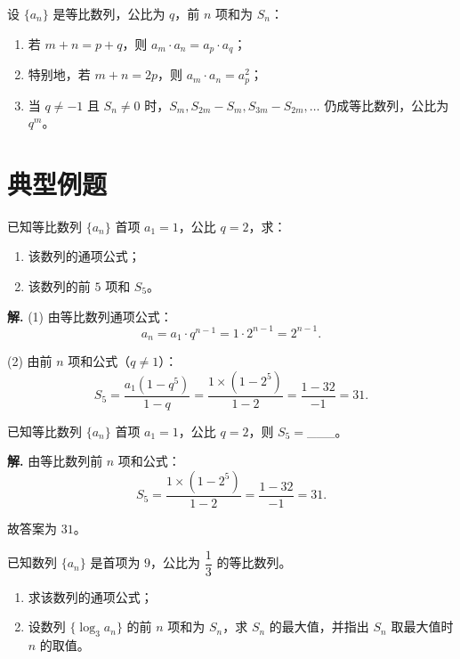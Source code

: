 \documentclass[11pt]{ctexrep}
\begin{document}
\begin{property}[重要性质]
    设 $\{a_n\}$ 是等比数列，公比为 $q$，前 $n$ 项和为 $S_n$：
    \begin{enumerate}
        \item 若 $m + n = p + q$，则 $a_m \cdot a_n = a_p \cdot a_q$；
        \item 特别地，若 $m + n = 2p$，则 $a_m \cdot a_n = a_p^2$；
        \item 当 $q \neq -1$ 且 $S_n \neq 0$ 时，$S_m, S_{2m} - S_m, S_{3m} - S_{2m}, \ldots$ 仍成等比数列，公比为 $q^m$。
    \end{enumerate}
\end{property}

\section*{典型例题}

\begin{example}[基本量计算]
    已知等比数列 $\{a_n\}$ 首项 $a_1 = 1$，公比 $q = 2$，求：
    \begin{enumerate}
        \item 该数列的通项公式；
        \item 该数列的前 $5$ 项和 $S_5$。
    \end{enumerate}
\end{example}

\textbf{解.} (1) 由等比数列通项公式：
\[
    a_n = a_1 \cdot q^{n-1} = 1 \cdot 2^{n-1} = 2^{n-1}.
\]

(2) 由前 $n$ 项和公式（$q \neq 1$）：
\[
    S_5 = \frac{a_1(1-q^5)}{1-q} = \frac{1 \times (1-2^5)}{1-2} = \frac{1-32}{-1} = 31.
\]

\begin{realexam}[2023 崇明一模]
    已知等比数列 $\{a_n\}$ 首项 $a_1 = 1$，公比 $q = 2$，则 $S_5 =$\_\_\_。
\end{realexam}

\textbf{解.} 由等比数列前 $n$ 项和公式：
\[
    S_5 = \frac{1 \times (1-2^5)}{1-2} = \frac{1-32}{-1} = 31.
\]

故答案为 $31$。

\begin{example}[等比数列性质应用]
    已知数列 $\{a_n\}$ 是首项为 $9$，公比为 $\dfrac{1}{3}$ 的等比数列。
    \begin{enumerate}
        \item 求该数列的通项公式；
        \item 设数列 $\{\log_3 a_n\}$ 的前 $n$ 项和为 $S_n$，求 $S_n$ 的最大值，并指出 $S_n$ 取最大值时 $n$ 的取值。
    \end{enumerate}
\end{example}
\end{document}
